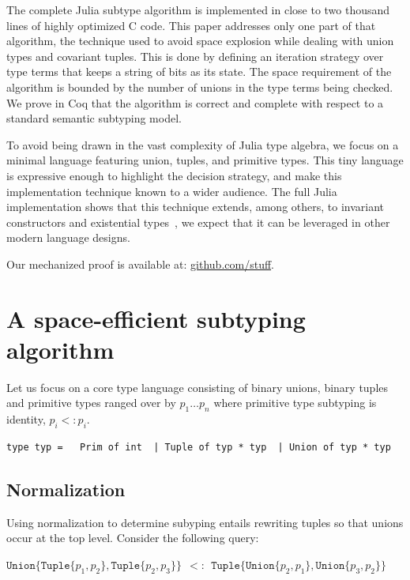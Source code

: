 \documentclass[a4paper,english]{lipics-v2019}
\newcommand{\xt}[1]{\texttt{#1}}
\newcommand{\union}[2]{\xt{Union\{}#1,#2\xt{\}}}
\newcommand{\tuple}[1]{\xt{Tuple\{}#1\xt{\}}}
\begin{document}
The complete Julia subtype algorithm is implemented in close to two thousand
lines of highly optimized C code. This paper addresses only one part of that
algorithm, the technique used to avoid space explosion while dealing with
union types and covariant tuples. This is done by defining an iteration
strategy over type terms that keeps a string of bits as its state. The space
requirement of the algorithm is bounded by the number of unions in the type
terms being checked. We prove in Coq that the algorithm is correct and
complete with respect to a standard semantic subtyping model.

To avoid being drawn in the vast complexity of Julia type algebra, we focus
on a minimal language featuring union, tuples, and primitive types. This
tiny language is expressive enough to highlight the decision strategy, and
make this implementation technique known to a wider audience.  The full
Julia implementation shows that this technique extends, among others, to
invariant constructors and existential types~\cite{DBLP:NardelliBPCBV18}, we
expect that it can be leveraged in other modern language
designs. 

\medskip
Our mechanized proof is available at: \url{github.com/stuff}.
\newpage

\section{A space-efficient subtyping algorithm}

Let us focus on a core type language consisting of binary unions, binary
tuples and primitive types ranged over by $p_1 \dots p_n$ where primitive
type subtyping is identity, $p_i <: p_i$.

\medskip
\begin{lstlisting}
type typ =   Prim of int  | Tuple of typ * typ  | Union of typ * typ
\end{lstlisting}
\medskip

\subsection{Normalization}\label{normalize}

Using normalization to determine subyping entails rewriting tuples so that
unions occur at the top level. Consider the following query:

\medskip
$\union{ \tuple{p_1,p_2}}{\tuple{p_2,p_3}} ~~ <:~~  \tuple{ \union{p_2}{p_1}, \union{p_3}{p_2}}$
\medskip
\end{document}
